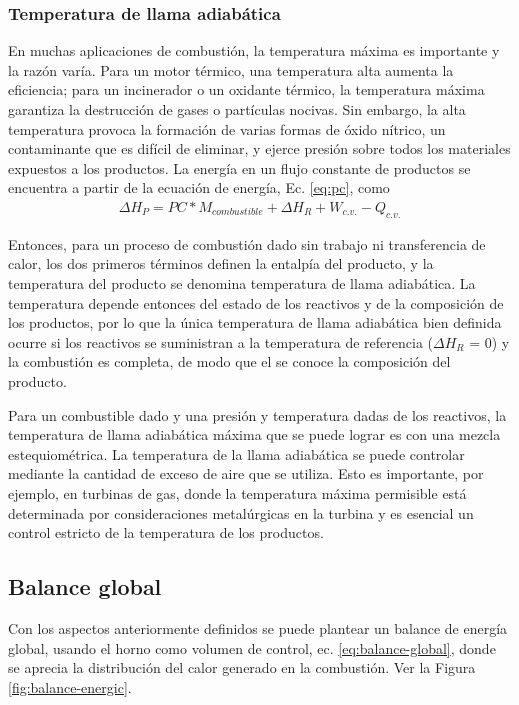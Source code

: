 \subsubsection{Temperatura de llama adiabática}
\par En muchas aplicaciones de combustión, la temperatura máxima es importante y la razón varía. Para un motor térmico, una temperatura alta aumenta la eficiencia; para un incinerador o un oxidante térmico, la temperatura máxima garantiza la destrucción de gases o partículas nocivas. Sin embargo, la alta temperatura provoca la formación de varias formas de óxido nítrico, un contaminante que es difícil de eliminar, y ejerce presión sobre todos los materiales expuestos a los productos. La energía en un flujo constante de productos se encuentra a partir de la ecuación de energía, Ec. \ref{eq:pc}, como
\begin{equation}
\begin{gathered}
    \Delta H_P = PC * M_{combustible} + \Delta H_R + W_{c.v.} - Q_{c.v.}
\end{gathered}
\end{equation}
\par Entonces, para un proceso de combustión dado sin trabajo ni transferencia de calor, los dos primeros términos definen la entalpía del producto, y la temperatura del producto se denomina temperatura de llama adiabática. La temperatura depende entonces del estado de los reactivos y de la composición de los productos, por lo que la única temperatura de llama adiabática bien definida ocurre si los reactivos se suministran a la temperatura de referencia ($\Delta H_R$ = 0) y la combustión es completa, de modo que el se conoce la composición del producto.\cite{bib:vanwylen}
\par Para un combustible dado y una presión y temperatura dadas de los reactivos, la temperatura de llama adiabática máxima que se puede lograr es con una mezcla estequiométrica. La temperatura de la llama adiabática se puede controlar mediante la cantidad de exceso de aire que se utiliza. Esto es importante, por ejemplo, en turbinas de gas, donde la temperatura máxima permisible está determinada por consideraciones metalúrgicas en la turbina y es esencial un control estricto de la temperatura de los productos.

\subsection{Balance global}
\par Con los aspectos anteriormente definidos se puede plantear un balance de energía global, usando el horno como volumen de control, ec. \ref{eq:balance-global}, donde se aprecia la distribución del calor generado en la combustión. Ver la Figura \ref{fig:balance-energic}.

